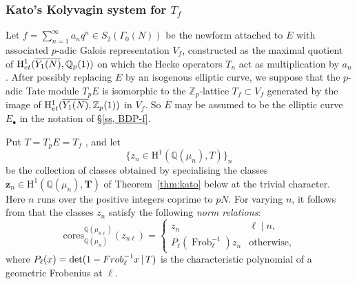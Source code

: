 \documentclass[10pt,reqno]{amsart}
\numberwithin{equation}{section}
\theoremstyle{plain}
\theoremstyle{definition}
\theoremstyle{definition}
\theoremstyle{plain}
\theoremstyle{plain}
\theoremstyle{plain}
\theoremstyle{plain}
\theoremstyle{plain}
\theoremstyle{plain}
\newcommand{\Z}{\mathbb{Z}}
\newcommand{\Q}{\mathbb{Q}}
\DeclareMathOperator{\frob}{Frob}
\newcommand{\rH}{\mathrm{H}}
\begin{document}
\subsubsection{Kato's Kolyvagin system for $T_f$}

Let $f=\sum_{n=1}^\infty a_nq^n\in S_2(\Gamma_0(N))$ be the newform attached to $E$ with associated $p$-adic Galois representation $V_f$, constructed as the maximal quotient of $\rH^1_{\rm et}(\overline{Y_1(N)},\Q_p(1))$ on which the Hecke operators $T_n$ act as multiplication by $a_n$. After possibly replacing $E$ by an isogenous elliptic curve, we suppose that the $p$-adic Tate module $T_pE$ is isomorphic  to the $\Z_p$-lattice $T_f\subset V_f$ generated by the image of $\rH^1_{\rm et}(\overline{Y_1(N)},\Z_p(1))$ in $V_f$. {So $E$ may be assumed to be the elliptic curve $E_\bullet$ in the notation of \S\ref{ss, BDP-f}}.

Put { $T=T_pE = T_f$} , %
and let 
\[
\{z_n\in \rH^1(\Q(\mu_n),T)\}_n
\]
be the collection of classes obtained by specialising the classes $\mathbf{z}_n\in\rH^1(\Q(\mu_n),\mathbf{T})$ of Theorem~\ref{thm:kato} below at the trivial character.
%
Here $n$ runs over the positive integers coprime to $pN$. For varying $n$, it follows from \cite[Prop.~8.12]{kato-euler-systems} that the classes $z_n$ satisfy the following \emph{norm relations}:
\begin{equation}\label{eqNR}
\text{cores}^{\Q(\mu_{n\ell})}_{\Q(\mu_{n})}(z_{n\ell})=\begin{cases}
z_n &\ell\mid n,\\[0.2em]
P_{\ell}(\frob_{\ell}^{-1})z_n &\text{otherwise},
\end{cases}
\end{equation}
where $P_{\ell}(x)=\det(1-{\rm Frob}_{\ell}^{-1}x\,|\,T)$ is the characteristic polynomial of 
a geometric Frobenius at $\ell$.
\end{document}
